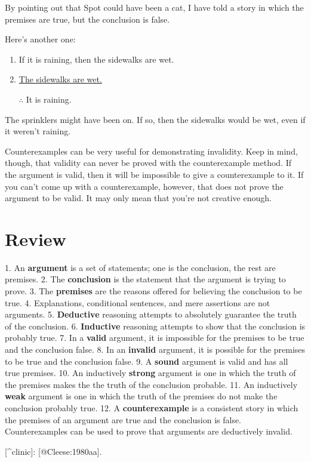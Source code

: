 By pointing out that Spot could have been a cat, I have told a story in
which the premises are true, but the conclusion is false.

Here's another one:

\begin{enumerate}
\item If it is raining, then the sidewalks are wet.
\item \underline{The sidewalks are wet.}
\item [$\therefore$] It is raining.
\end{enumerate}

The sprinklers might have been on. If so, then the sidewalks would be wet, even if it weren't raining.

Counterexamples can be very useful for demonstrating invalidity. Keep in mind, though, that validity can never be proved with the counterexample method. If the argument is valid, then it will be impossible to give a counterexample to it. If you can't come up with a counterexample, however, that does not prove the argument to be valid. It may only mean that you're not creative enough.

\section{Review}
\label{sec:arg-review}

1.  An \textbf{argument} is a set of statements; one is the conclusion, the rest are premises.
2.  The \textbf{conclusion} is the statement that the argument is trying to prove.
3.  The \textbf{premises} are the reasons offered for believing the conclusion to be true.
4.  Explanations, conditional sentences, and mere assertions are not arguments.
5.  \textbf{Deductive} reasoning attempts to absolutely guarantee the truth of the conclusion.
6.  \textbf{Inductive} reasoning attempts to show that the conclusion is probably true.
7.  In a \textbf{valid} argument, it is impossible for the premises to be true and the conclusion false.
8.  In an \textbf{invalid} argument, it is possible for the premises to be true and the conclusion false.
9.  A \textbf{sound} argument is valid and has all true premises.
10. An inductively \textbf{strong} argument is one in which the truth of the premises makes the the truth of the conclusion probable.
11. An inductively \textbf{weak} argument is one in which the truth of the premises do not make the conclusion probably true.
12. A \textbf{counterexample} is a consistent story in which the premises of an argument are true and the conclusion is false. Counterexamples can be used to prove that arguments are deductively invalid.


[^clinic]: [@Cleese:1980aa].
